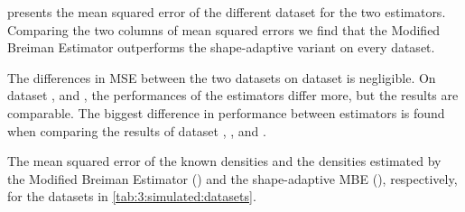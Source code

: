 
 presents the mean squared error of the different dataset for the two estimators. Comparing the two columns of mean squared errors we find that the Modified Breiman Estimator outperforms the shape-adaptive variant on every dataset. 

The differences in MSE between the two datasets on dataset \ferdosiOne is negligible. On dataset \ferdosiTwo, and \ferdosiFive, the performances of the estimators differ more, but the results are comparable. The biggest difference in performance between estimators is found when comparing the results of dataset \baakmanOne, \baakmanFour, and \baakmanFive.

\begin{table}
	\centering
	
	\caption{The mean squared error of the known densities and the densities estimated by the Modified Breiman Estimator (\mbe) and the shape-adaptive MBE (\sambe), respectively, for the datasets in \cref{tab:3:simulated:datasets}.} 	
	\label{tab:4:results:mse}
\end{table}